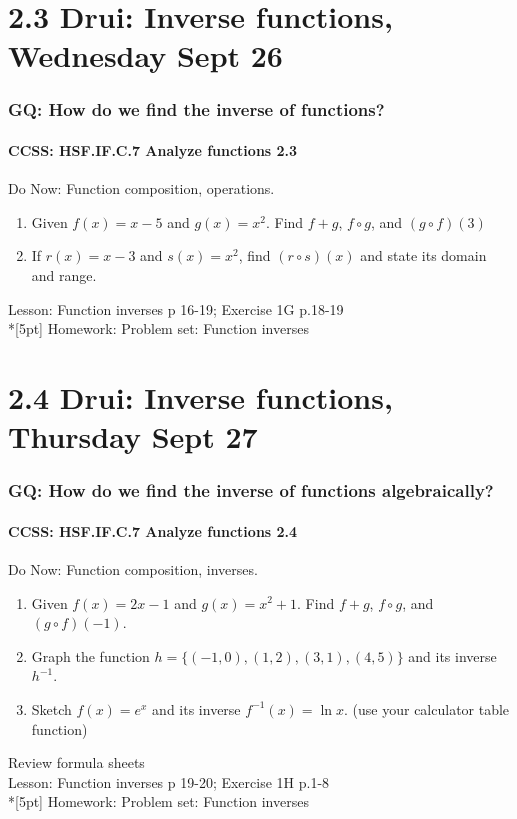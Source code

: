 \documentclass{beamer}
\begin{document}
\section{2.3 Drui: Inverse functions, Wednesday Sept 26}
  \frame
  {
    \frametitle{GQ: How do we find the inverse of functions?}
    \framesubtitle{CCSS: HSF.IF.C.7 Analyze functions    \alert{2.3}}

    \begin{block}{Do Now: Function composition, operations.}
    \begin{enumerate}
        \item Given $f(x)=x-5$ and $g(x)=x^2$. Find $f+g$, $f \circ g$, and $(g \circ f)(3)$
        \item If $r(x)=x-3$ and $s(x)=x^2$, find $(r \circ s)(x)$ and state its domain and range.
    \end{enumerate}
    \end{block}
    Lesson: Function inverses p 16-19; Exercise 1G p.18-19 \\*[5pt]
    Homework: Problem set: Function inverses
  }

\section{2.4 Drui: Inverse functions, Thursday Sept 27}
  \frame
  {
    \frametitle{GQ: How do we find the inverse of functions algebraically?}
    \framesubtitle{CCSS: HSF.IF.C.7 Analyze functions    \alert{2.4}}

    \begin{block}{Do Now: Function composition, inverses.}
    \begin{enumerate}
        \item Given $f(x)=2x-1$ and $g(x)=x^2+1$. Find $f+g$, $f \circ g$, and $(g \circ f)(-1)$.
        \item Graph the function $h=\{(-1,0),(1, 2),(3, 1), (4,5)\}$ and its inverse $h^{-1}$.
        \item Sketch $f(x)=e^x$ and its inverse $f^{-1}(x)=\ln x$. (use your calculator table function)
    \end{enumerate}
    \end{block}
    Review formula sheets\\
    Lesson: Function inverses p 19-20; Exercise 1H p.1-8 \\*[5pt]
    Homework: Problem set: Function inverses
  }
\end{document}
